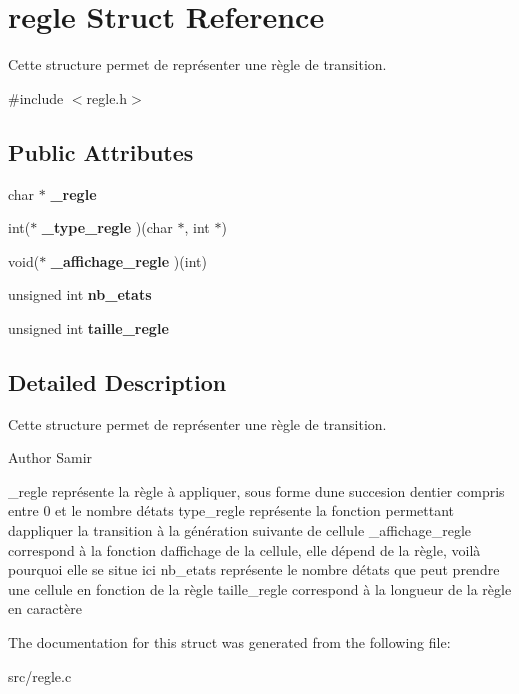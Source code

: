 \hypertarget{structregle}{}\section{regle Struct Reference}
\label{structregle}


Cette structure permet de représenter une règle de transition.  




{\ttfamily \#include $<$regle.\+h$>$}

\subsection*{Public Attributes}
\begin{DoxyCompactItemize}
\item 
\mbox{\label{structregle_a93c3b6352d3440704ea937d901b60507}} 
char $\ast$ {\bfseries \+\_\+regle}
\item 
\mbox{\label{structregle_ad637964e86be8cf4612e9919a843990b}} 
int($\ast$ {\bfseries \+\_\+type\+\_\+regle} )(char $\ast$, int $\ast$)
\item 
\mbox{\label{structregle_a49b56d4a4e935e8028caa8e9933728b8}} 
void($\ast$ {\bfseries \+\_\+affichage\+\_\+regle} )(int)
\item 
\mbox{\label{structregle_adc6243fac2a2edb105cc19fd7cdbc160}} 
unsigned int {\bfseries nb\+\_\+etats}
\item 
\mbox{\label{structregle_aca265533fe6390b22b923bc52115c1f4}} 
unsigned int {\bfseries taille\+\_\+regle}
\end{DoxyCompactItemize}


\subsection{Detailed Description}
Cette structure permet de représenter une règle de transition. 

\begin{DoxyAuthor}{Author}
Samir
\end{DoxyAuthor}
\+\_\+regle représente la règle à appliquer, sous forme d\textquotesingle{}une succesion d\textquotesingle{}entier compris entre 0 et le nombre d\textquotesingle{}états type\+\_\+regle représente la fonction permettant d\textquotesingle{}appliquer la transition à la génération suivante de cellule \+\_\+affichage\+\_\+regle correspond à la fonction d\textquotesingle{}affichage de la cellule, elle dépend de la règle, voilà pourquoi elle se situe ici nb\+\_\+etats représente le nombre d\textquotesingle{}états que peut prendre une cellule en fonction de la règle taille\+\_\+regle correspond à la longueur de la règle en caractère 

The documentation for this struct was generated from the following file\+:\begin{DoxyCompactItemize}
\item 
src/regle.\+c\end{DoxyCompactItemize}

